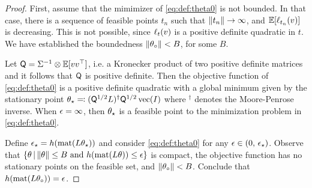 \begin{proof}
    First, assume that the mimimizer of \eqref{eq:def:theta0} is not bounded. In that case, there is a sequence of feasible points $t_n$ such that $\lVert t_n\rVert \to \infty$, and $\mathbb{E} [\ell_{t_n}(v)] $ is decreasing. This is not possible, since $\ell_t(v)$ is a positive definite quadratic in $t$. We have established the boundedness $\lVert\theta_\circ\rVert < B$, for some $B$.

    Let $\mathsf{Q} = \Sigma^{-1} \otimes  \mathbb{E}[vv^\top]$, i.e. a Kronecker product of two positive definite matrices and it follows that $\mathsf{Q}$ is positive definite. Then the objective function of \eqref{eq:def:theta0} is a positive definite quadratic with a global minimum given by the stationary point  $ \theta_\star \eqqcolon (\mathsf{Q}{}^{1/2} L )^\dagger \mathsf{Q}{}^{1/2} \operatorname*{vec}(I ) $ where $^\dagger$ denotes the Moore-Penrose inverse.
    When $\epsilon = \infty$, then $\theta_\star$ is a feasible point to the minimization problem in \eqref{eq:def:theta0}.

    Define $\epsilon_\star = h( \operatorname*{mat}(L\theta_\star))$ and consider \eqref{eq:def:theta0} for any $\epsilon \in (0,\,\epsilon_\star)$.
    Observe that $\left\{ \theta \,\middle|\, \lVert\theta\rVert\leq B \text{ and } h( \operatorname*{mat}(L\theta)) \leq \epsilon \right\}$ is compact, the objective function has no stationary points on the feasible set, and $\lVert\theta_\circ\rVert< B$. Conclude that $h(\operatorname*{mat}(L\theta_\circ)) = \epsilon$.
\end{proof}

